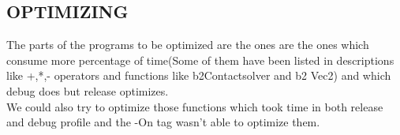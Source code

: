 \documentclass[11pt]{article}
\begin{document}
\subsection{OPTIMIZING}
The parts of the programs to be optimized are the ones  are the ones which consume more percentage of time(Some of them have been listed in descriptions like +,*,- operators and functions like b2Contactsolver and b2 Vec2) and which debug does but release optimizes. \\
We could also try to optimize those functions which took time in both release and debug profile and the -On tag wasn't able to optimize them.
\end{document}

